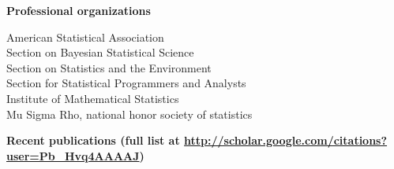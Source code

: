 \documentclass[11pt]{article}
\def\newsectn{\vspace*{0.8cm}}
\begin{document}
\newsectn
\noindent \textbf{Professional organizations}

American Statistical Association\\
  \hspace*{0.3cm}Section on Bayesian Statistical Science\\
  \hspace*{0.3cm}Section on Statistics and the Environment\\
  \hspace*{0.3cm}Section for Statistical Programmers and Analysts\\
Institute of Mathematical Statistics\\
Mu Sigma Rho, national honor society of statistics %




\newsectn
\textbf{Recent publications (full list at \url{http://scholar.google.com/citations?user=Pb_Hvq4AAAAJ})}
\end{document}
